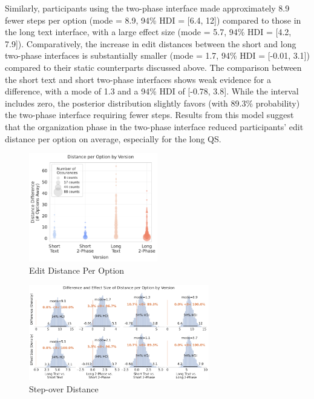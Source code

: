 Similarly, participants using the two-phase interface made approximately 8.9 fewer steps per option (mode = 8.9, 94\% HDI = [6.4, 12]) compared to those in the long text interface, with a large effect size (mode = 5.7, 94\% HDI = [4.2, 7.9]). Comparatively, the increase in edit distances between the short and long two-phase interfaces is substantially smaller (mode = 1.7, 94\% HDI = [-0.01, 3.1]) compared to their static counterparts discussed above. The comparison between the short text and short two-phase interfaces shows weak evidence for a difference, with a mode of 1.3 and a 94\% HDI of [-0.78, 3.8]. While the interval includes zero, the posterior distribution slightly favors (with 89.3\% probability) the two-phase interface requiring fewer steps. Results from this model suggest that the organization phase in the two-phase interface reduced participants' edit distance per option on average, especially for the long QS.

\begin{figure}[ht]
    \centering
    \includegraphics[width=0.5\textwidth]{content/image/distance/distance_diff_by_version.pdf}
    \caption{Edit Distance Per Option}
    \label{fig:dist_per_option}
\end{figure}

\begin{figure}[ht]
    \centering
    \includegraphics[width=0.7\textwidth]{content/image/distance/distance_diff_per_option_effect_size_by_version.pdf}
    \caption{Step-over Distance}
    \label{fig:dist_per_option_bayesian}
\end{figure}

